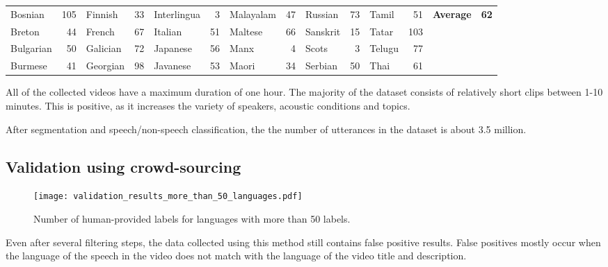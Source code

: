 \documentclass{article}
\begin{document}
\begin{table*}[tbh]
\begin{tabular}{lr|lr|lr|lr|lr|lr|lr}
Bosnian     & 105   & Finnish   & 33    & Interlingua & 3     & Malayalam     & 47    & Russian    & 73    & Tamil     & 51    & \textbf{Average}    & \textbf{62}    \\
Breton      & 44    & French    & 67    & Italian     & 51    & Maltese       & 66    & Sanskrit   & 15    & Tatar     & 103   &            &       \\
Bulgarian   & 50    & Galician  & 72    & Japanese    & 56    & Manx          & 4     & Scots      & 3     & Telugu    & 77    &            &       \\
Burmese     & 41    & Georgian  & 98    & Javanese    & 53    & Maori         & 34    & Serbian    & 50    & Thai      & 61    &            &      \\
\hline
\end{tabular}
\end{table*}






All of the collected videos have a maximum duration of one hour. The majority of the dataset consists of relatively
short clips between 1-10 minutes. This is positive, as it increases the variety
of speakers, acoustic conditions and topics.

After segmentation and speech/non-speech classification, the the number of utterances in the dataset is about 3.5 million.

\subsection{Validation using crowd-sourcing}

\begin{figure}[tb]
  \centering
  \texttt{[image: validation\_results\_more\_than\_50\_languages.pdf]}
  \caption{Number of human-provided labels for languages with more than 50 labels.}
  \label{fig:validation_per_language}
\end{figure}


Even after several filtering steps, the data collected using this method
still contains false positive results. False positives mostly occur when the language of the speech
in the video does not match with the language of the video title and description.
\end{document}
